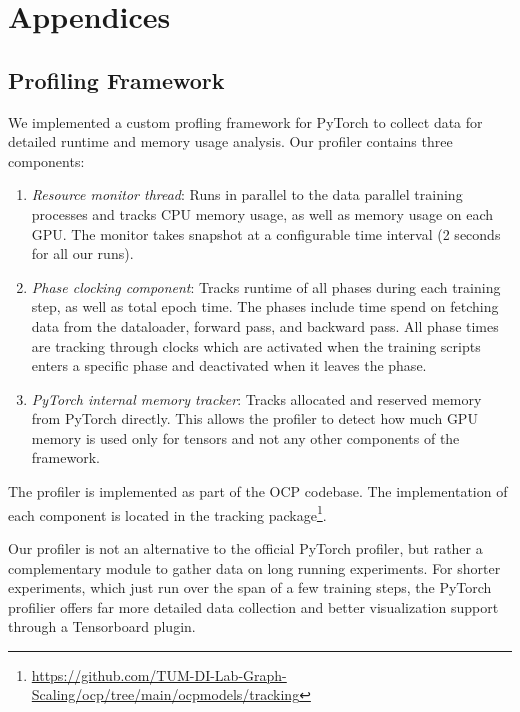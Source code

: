 \section*{Appendices}
\renewcommand{\thesubsection}{\Alph{subsection}}

\subsection{Profiling Framework}
\label{appendix:profiling}

We implemented a custom profling framework for PyTorch to collect data for detailed runtime 
and memory usage analysis. Our profiler contains three components:

\begin{enumerate}
    \item \textit{Resource monitor thread}: Runs in parallel to the data parallel training 
    processes and tracks CPU memory usage, as well as memory usage on each GPU. The monitor 
    takes snapshot at a configurable time interval (2 seconds for all our runs).
    \item \textit{Phase clocking component}: Tracks runtime of all phases during each training 
    step, as well as total epoch time. The phases include time spend on fetching data from 
    the dataloader, forward pass, and backward pass. All phase times are tracking through clocks 
    which are activated when the training scripts enters a specific phase and deactivated when 
    it leaves the phase.
    \item \textit{PyTorch internal memory tracker}: Tracks allocated and reserved memory from 
    PyTorch directly. This allows the profiler to detect how much GPU memory is used only for
    tensors and not any other components of the framework.
\end{enumerate}


The profiler is implemented as part of the OCP codebase. The implementation of each component 
is located in the tracking package\footnote{\url{https://github.com/TUM-DI-Lab-Graph-Scaling/ocp/tree/main/ocpmodels/tracking}}.

Our profiler is not an alternative to the official PyTorch profiler, but rather a complementary 
module to gather data on long running experiments. For shorter experiments, which just run over 
the span of a few training steps, the PyTorch profilier offers far more detailed data collection 
and better visualization support through a Tensorboard plugin.



